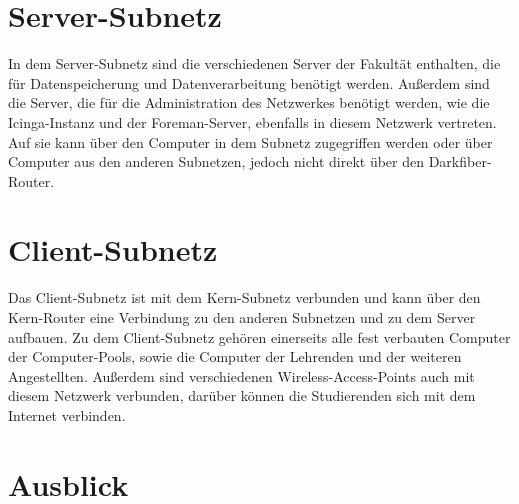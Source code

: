 \section{Server-Subnetz}
In dem Server-Subnetz sind die verschiedenen Server der Fakultät enthalten, die für Datenspeicherung und Datenverarbeitung benötigt werden. Außerdem sind die Server, die für die Administration des Netzwerkes benötigt werden, wie die Icinga-Instanz und der Foreman-Server, ebenfalls in diesem Netzwerk vertreten. Auf sie kann über den Computer in dem Subnetz zugegriffen werden oder über Computer aus den anderen Subnetzen, jedoch nicht direkt über den Darkfiber-Router.

\section{Client-Subnetz}
Das Client-Subnetz ist mit dem Kern-Subnetz verbunden und kann über den Kern-Router eine Verbindung zu den anderen Subnetzen und zu dem Server aufbauen. Zu dem Client-Subnetz gehören einerseits alle fest verbauten Computer der Computer-Pools, sowie die Computer der Lehrenden und der weiteren Angestellten. Außerdem sind verschiedenen Wireless-Access-Points auch mit diesem Netzwerk verbunden, darüber können die Studierenden sich mit dem Internet verbinden.

\section{Ausblick}
